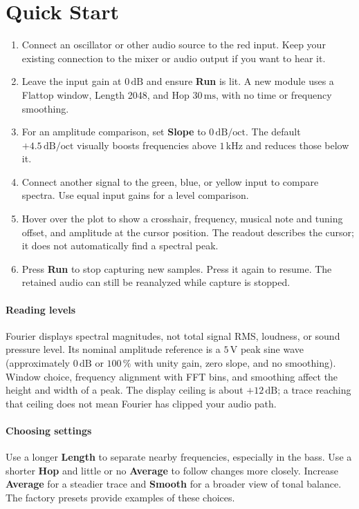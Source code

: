 \section{Quick Start}\label{sec:quick-start}

\begin{enumerate}
  \item Connect an oscillator or other audio source to the red input. Keep
  your existing connection to the mixer or audio output if you want to hear it.
  \item Leave the input gain at $0\,\mathrm{dB}$ and ensure \textbf{Run} is lit.
  A new module uses a Flattop window, Length 2048, and Hop
  $30\,\mathrm{ms}$, with no time or frequency smoothing.
  \item For an amplitude comparison, set \textbf{Slope} to
  $0\,\mathrm{dB/oct}$. The default $+4.5\,\mathrm{dB/oct}$ visually boosts
  frequencies above $1\,\mathrm{kHz}$ and reduces those below it.
  \item Connect another signal to the green, blue, or yellow input to
  compare spectra. Use equal input gains for a level comparison.
  \item Hover over the plot to show a crosshair, frequency, musical note
  and tuning offset, and amplitude at the cursor position. The readout
  describes the cursor; it does not automatically find a spectral peak.
  \item Press \textbf{Run} to stop capturing new samples. Press it again
  to resume. The retained audio can still be reanalyzed while capture is stopped.
\end{enumerate}

\paragraph{Reading levels}
Fourier displays spectral magnitudes, not total signal RMS, loudness, or
sound pressure level. Its nominal amplitude reference is a
$5\,\mathrm{V}$ peak sine wave (approximately $0\,\mathrm{dB}$ or
$100\,\%$ with unity gain, zero slope, and no smoothing). Window choice,
frequency alignment with FFT bins, and smoothing affect the height and width
of a peak. The display ceiling is about $+12\,\mathrm{dB}$; a trace reaching
that ceiling does not mean Fourier has clipped your audio path.

\paragraph{Choosing settings}
Use a longer \textbf{Length} to separate nearby frequencies, especially in
the bass. Use a shorter \textbf{Hop} and little or no \textbf{Average} to
follow changes more closely. Increase \textbf{Average} for a steadier trace
and \textbf{Smooth} for a broader view of tonal balance. The factory presets
provide examples of these choices.
